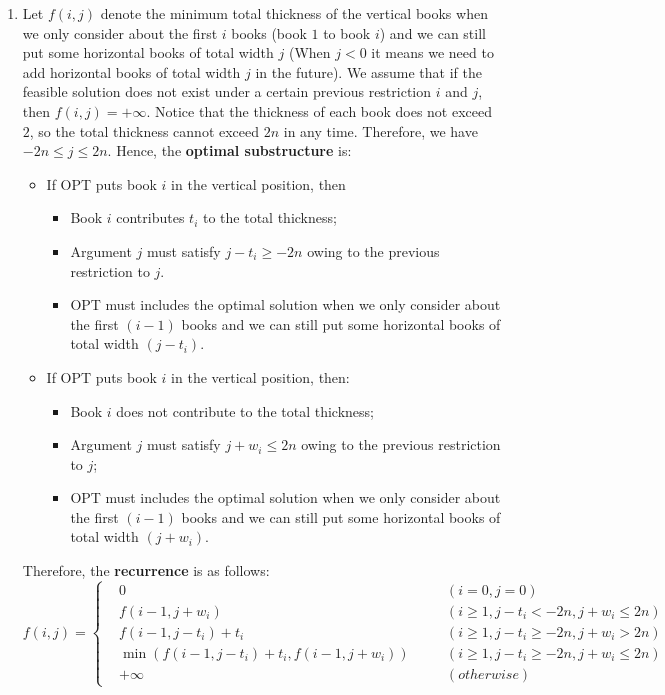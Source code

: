 \documentclass[12pt,a4paper]{article}
\makeatletter
\newtheorem*{solution}{Solution}
\theoremstyle{definition}
\renewenvironment{solution}[1][Solution] {\par\pushQED{\qed}\normalfont\topsep6\p@\@plus6\p@\relax\trivlist\item[\hskip\labelsep\bfseries#1\@addpunct{.}]\ignorespaces}{\popQED\endtrivlist\@endpefalse} \makeatother
\makeatother
\begin{document}
\begin{enumerate}
    \begin{solution}
        Let $f(i,j)$ denote the minimum total thickness of the vertical books when we only consider about the first $i$ books (book $1$ to book $i$) and we can still put some horizontal books of total width $j$ (When $j < 0$ it means we need to add horizontal books of total width $j$ in the future). We assume that if the feasible solution does not exist under a certain previous restriction $i$ and $j$, then $f(i,j) = +\infty$. Notice that the thickness of each book does not exceed $2$, so the total thickness cannot exceed $2n$ in any time. Therefore, we have $-2n \leq j \leq 2n$. Hence, the \textbf{optimal substructure} is:
        \begin{itemize}
        \item If OPT puts book $i$ in the vertical position, then
            \begin{itemize}
            \item Book $i$ contributes $t_i$ to the total thickness;
            \item Argument $j$ must satisfy $j - t_i \ge -2n$ owing to the previous restriction to $j$.
            \item OPT must includes the optimal solution when we only consider about the first $(i-1)$ books and we can still put some horizontal books of total width $(j - t_i)$.
            \end{itemize}
        \item If OPT puts book $i$ in the vertical position, then:
            \begin{itemize}
            \item Book $i$ does not contribute to the total thickness;
            \item Argument $j$ must satisfy $j + w_i \leq 2n$ owing to the previous restriction to $j$;
            \item OPT must includes the optimal solution when we only consider about the first $(i-1)$ books and we can still put some horizontal books of total width $(j + w_i)$.
            \end{itemize}
        \end{itemize}
        Therefore, the \textbf{recurrence} is as follows:
        \begin{displaymath}
        f(i,j) = \left\{
        \begin{aligned}
        & 0 & \quad & (i = 0, j = 0) \\
        & f(i-1, j + w_i) & \quad & (i \geq 1, j - t_i < -2n, j + w_i \leq 2n) \\
        & f(i-1, j - t_i) + t_i & \quad  & (i \geq 1, j - t_i \geq -2n, j + w_i > 2n) \\
        & \min(f(i-1, j - t_i) + t_i, f(i-1, j + w_i)) & \quad & (i \geq 1, j - t_i \geq -2n, j + w_i \leq 2n) \\
        & +\infty & \quad & (otherwise)
        \end{aligned}
        \right.
        \end{displaymath}


\end{solution}
\end{enumerate}
\end{document}

